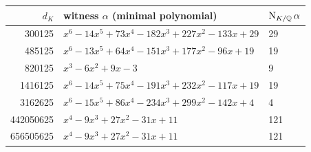 \begin{tabular}{rll}
\toprule
$d_K$ & witness $\alpha$ (minimal polynomial) & $\operatorname{N}_{K/\mathbb{Q}}\alpha$\\
\midrule
300125 & $x^6 - 14x^5 + 73x^4 - 182x^3 + 227x^2 - 133x + 29$ & 29\\
485125 & $x^6 - 13x^5 + 64x^4 - 151x^3 + 177x^2 - 96x + 19$ & 19\\
820125 & $x^3 - 6x^2 + 9x - 3$ & 9\\
1416125 & $x^6 - 14x^5 + 75x^4 - 191x^3 + 232x^2 - 117x + 19$ & 19\\
3162625 & $x^6 - 15x^5 + 86x^4 - 234x^3 + 299x^2 - 142x + 4$ & 4\\
\midrule
442050625 & $x^4 - 9x^3 + 27x^2 - 31x + 11$ & 121\\
656505625 & $x^4 - 9x^3 + 27x^2 - 31x + 11$ & 121\\
\bottomrule
\end{tabular}
